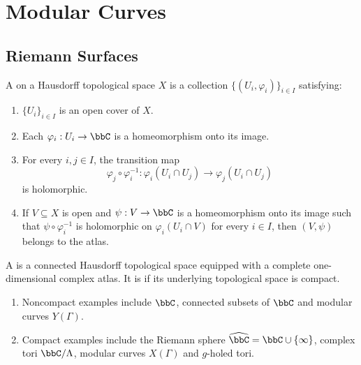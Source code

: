 \section{Modular Curves}\label{Sec:MF_modular_curves}
\subsection{Riemann Surfaces}\label{Sec:MF_Riemann_surfaces}
\begin{definition}
    A  on a Hausdorff topological space $X$ is a collection $\{(U_i, \varphi_i)\}_{i \in I}$ satisfying:
    \begin{enumerate}[label=(\arabic*)]
        \item $\{U_i\}_{i \in I}$ is an open cover of $X$.
        \item Each $\varphi_i : U_i \to \bbC$ is a homeomorphism onto its image.
        \item For every $i, j \in I$, the transition map
        \[
            \varphi_j \circ \varphi_i^{-1} : \varphi_i(U_i \cap U_j) \to \varphi_j(U_i \cap U_j)
        \]
        is holomorphic.
        \item If $V \subseteq X$ is open and $\psi : V \to \bbC$ is a homeomorphism onto its image such that $\psi \circ \varphi_i^{-1}$ is holomorphic on $\varphi_i(U_i \cap V)$ for every $i \in I$, then $(V, \psi)$ belongs to the atlas.
    \end{enumerate}
\end{definition}

\begin{definition}
    A  is a connected Hausdorff topological space equipped with a complete one-dimensional complex atlas. It is  if its underlying topological space is compact.
\end{definition}

\begin{example}
    \leavevmode
    \begin{enumerate}[label=(\arabic*)]
        \item Noncompact examples include $\bbC$, connected subsets of $\bbC$ and modular curves $Y(\Gamma)$.
        \item Compact examples include the Riemann sphere $\widehat{\bbC} = \bbC \cup \{\infty\}$, complex tori $\bbC/\Lambda$, modular curves $X(\Gamma)$ and $g$-holed tori.
    \end{enumerate}
\end{example}

